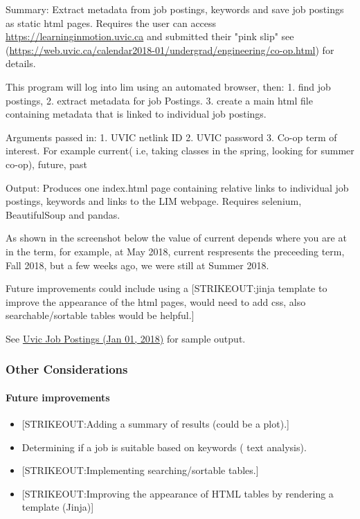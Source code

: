 Summary: Extract metadata from job postings, keywords and save job
postings as static html pages. Requires the user can access
\url{https://learninginmotion.uvic.ca} and submitted their "pink slip"
see
(\url{https://web.uvic.ca/calendar2018-01/undergrad/engineering/co-op.html})
for details.

This program will log into lim using an automated browser, then: 1. find
job postings, 2. extract metadata for job Postings. 3. create a main
html file containing metadata that is linked to individual job postings.

Arguments passed in: 1. UVIC netlink ID 2. UVIC password 3. Co-op term
of interest. For example current( i.e, taking classes in the spring,
looking for summer co-op), future, past

Output: Produces one index.html page containing relative links to
individual job postings, keywords and links to the LIM webpage. Requires
selenium, BeautifulSoup and pandas.

As shown in the screenshot below the value of current depends where you
are at in the term, for example, at May 2018, current respresents the
preceeding term, Fall 2018, but a few weeks ago, we were still at Summer
2018.

Future improvements could include using a {[}STRIKEOUT:jinja template to
improve the appearance of the html pages, would need to add css, also
searchable/sortable tables would be helpful.{]}

See \href{https://web.uvic.ca/~lidavid/jobScrapping/LIMScrap/}{Uvic Job
Postings (Jan 01, 2018)} for sample output.


\subsubsection{Other Considerations}\label{other-considerations}

\paragraph{Future improvements}\label{future-improvements}

\begin{itemize}
\tightlist
\item
  {[}STRIKEOUT:Adding a summary of results (could be a plot).{]}
\item
  Determining if a job is suitable based on keywords ( text analysis).
\item
  {[}STRIKEOUT:Implementing searching/sortable tables.{]}
\item
  {[}STRIKEOUT:Improving the appearance of HTML tables by rendering a
  template (Jinja){]}
\end{itemize}


